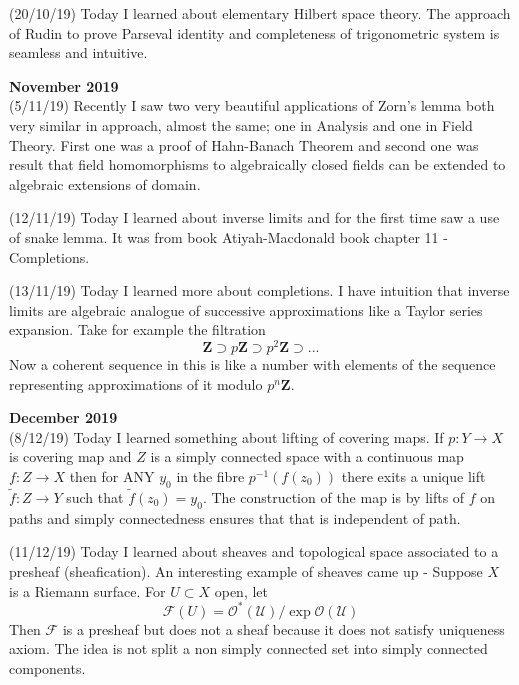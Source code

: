 \documentclass[12pt,a4paper]{article}
\begin{document}
(20/10/19) Today I learned about elementary Hilbert space theory. The approach of Rudin to prove Parseval identity and completeness of trigonometric system is seamless and intuitive. 
\\


\maketitle\textbf{November 2019}
\\


(5/11/19) Recently I saw two very beautiful applications of Zorn's lemma both very similar in approach, almost the same; one in Analysis and one in Field Theory. First one was a proof of Hahn-Banach Theorem and second one was result that field homomorphisms to algebraically closed fields can be extended to algebraic extensions of domain.

(12/11/19) Today I learned about inverse limits and for the first time saw a use of snake lemma. It was from book Atiyah-Macdonald book chapter 11 - Completions.

(13/11/19) Today I learned more about completions. I have intuition that inverse limits are algebraic analogue of successive approximations like a Taylor series expansion. Take for example the filtration 
\[ \mathbf{Z} \supset p\mathbf{Z} \supset p^2\mathbf{Z} \supset ... \] Now a coherent sequence in this is like a number with elements of the sequence representing approximations of it modulo $p^n\mathbf{Z}$. 
\\

\maketitle\textbf{December 2019}
\\

(8/12/19) Today I learned something about lifting of covering maps. If $p: Y \to X$ is covering map and $Z$ is a simply connected space with a continuous map $f: Z \to X$ then for ANY $y_0$ in the fibre $p^{-1}(f(z_0))$ there exits a unique lift $\tilde{f} : Z \to Y$ such that $\tilde{f}(z_0)=y_0$. The construction of the map is by lifts of $f$ on paths and simply connectedness ensures that that is independent of path. 

(11/12/19) Today I learned about sheaves and topological space associated to a presheaf (sheafication). An interesting example of sheaves came up - Suppose $X$ is a Riemann surface. For $U\subset X$ open, let
 \[ \mathcal{F}(U)=\mathcal{O^*(U)}/ \exp  \mathcal{O(U)} \]
Then $\mathcal{F}$ is a presheaf but does not a sheaf because it does not satisfy uniqueness axiom. The idea is not split a non simply connected set into simply connected components.
\end{document}
